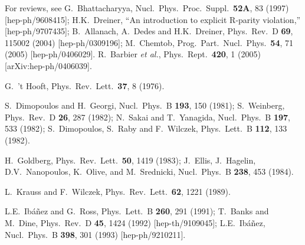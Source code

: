\documentclass[12pt]{article}
\def\perspectives{in {\it Perspectives on Supersymmetry}, ed.
G.L.~Kane (World Scientific, 1998)}
\begin{document}
\begin{thebibliography}{999}
For reviews, see
G.~Bhattacharyya,
  Nucl.\ Phys.\ Proc.\ Suppl.\  {\bf 52A}, 83 (1997)
  [hep-ph/9608415];
H.K.~Dreiner,
  ``An introduction to explicit R-parity violation,''
  [hep-ph/9707435];
B.~Allanach, A.~Dedes and H.K.~Dreiner,
  Phys.\ Rev.\ D {\bf 69}, 115002 (2004)
  [hep-ph/0309196];
M.~Chemtob,
  Prog.\ Part.\ Nucl.\ Phys.\  {\bf 54}, 71 (2005)
  [hep-ph/0406029].
R.~Barbier {\it et al.},
  Phys.\ Rept.\  {\bf 420}, 1 (2005)
  [arXiv:hep-ph/0406039].

G.~'t Hooft,
  Phys.\ Rev.\ Lett.\  {\bf 37}, 8 (1976).

S.~Dimopoulos and H.~Georgi,
  Nucl.\ Phys.\ B {\bf 193}, 150 (1981);
S.~Weinberg, 
  Phys.\ Rev.\ D {\bf 26}, 287 (1982);
N.~Sakai and T.~Yanagida, 
  Nucl.\ Phys.\ B {\bf 197}, 533 (1982);
S.~Dimopoulos, S.~Raby and F.~Wilczek, 
  Phys.\ Lett.\ B {\bf 112}, 133 (1982).

H.~Goldberg, 
  Phys.\ Rev.\ Lett.\  {\bf 50}, 1419 (1983);
J.~Ellis, J.~Hagelin, D.V.~Nanopoulos, K.~Olive, and M.~Srednicki,
  Nucl.\ Phys.\ B {\bf 238}, 453 (1984).

L.~Krauss and F.~Wilczek, 
  Phys.\ Rev.\ Lett.\  {\bf 62}, 1221 (1989).

L.E.~Ib\'a\~nez and G.~Ross,
  Phys.\ Lett.\ B {\bf 260}, 291 (1991);
T.~Banks and M.~Dine, 
  Phys.\ Rev.\ D {\bf 45}, 1424 (1992)
  [hep-th/9109045];
L.E.~Ib\'a\~nez, 
  Nucl.\ Phys.\ B {\bf 398}, 301 (1993)
  [hep-ph/9210211].


\end{thebibliography}
\end{document}

